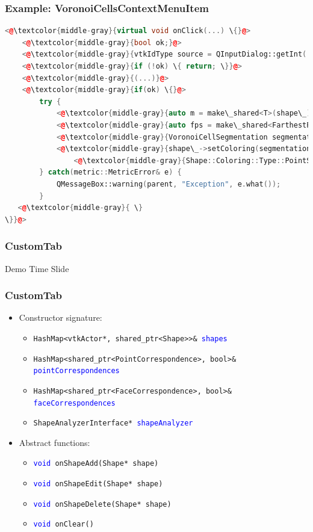 \documentclass[compress]{beamer}
\begin{document}
\begin{frame}[fragile]
  \frametitle{Example: VoronoiCellsContextMenuItem}

\begin{lstlisting}[language=C++, numbers=none]
<@\textcolor{middle-gray}{virtual void onClick(...) \{}@>
    <@\textcolor{middle-gray}{bool ok;}@>
    <@\textcolor{middle-gray}{vtkIdType source = QInputDialog::getInt(...);}@>
    <@\textcolor{middle-gray}{if (!ok) \{ return; \}}@>
    <@\textcolor{middle-gray}{(...)}@>
    <@\textcolor{middle-gray}{if(ok) \{}@>
        try {
            <@\textcolor{middle-gray}{auto m = make\_shared<T>(shape\_);}@>
            <@\textcolor{middle-gray}{auto fps = make\_shared<FarthestPointSampling>(shape\_, m, source, numberOfSegments);}@>
            <@\textcolor{middle-gray}{VoronoiCellSegmentation segmentation(shape\_, m, fps);}@>
            <@\textcolor{middle-gray}{shape\_->setColoring(segmentation.getSegments(), }@>
            	<@\textcolor{middle-gray}{Shape::Coloring::Type::PointSegmentation);}@>
        } catch(metric::MetricError& e) {
            QMessageBox::warning(parent, "Exception", e.what());
        }
   <@\textcolor{middle-gray}{ \}
\}}@>
\end{lstlisting}

\end{frame}

\begin{frame}
	\frametitle{CustomTab}
	
	Demo Time Slide
	
\end{frame}

\begin{frame}
	\frametitle{CustomTab}
	
	\begin{itemize}
		\item Constructor signature:
		\begin{itemize}
			\item \texttt{HashMap<vtkActor*, shared\_ptr<Shape>>\& \textcolor{blue}{shapes}}
			\item \texttt{HashMap<shared\_ptr<PointCorrespondence>, bool>\& \textcolor{blue}{pointCorrespondences}}
			\item \texttt{HashMap<shared\_ptr<FaceCorrespondence>, bool>\& \textcolor{blue}{faceCorrespondences}}
			\item \texttt{ShapeAnalyzerInterface* \textcolor{blue}{shapeAnalyzer}}
		\end{itemize}
		\item Abstract functions:
		\begin{itemize}
			\item \texttt{\textcolor{blue}{void} onShapeAdd(Shape* shape)}
			\item \texttt{\textcolor{blue}{void} onShapeEdit(Shape* shape)}
			\item \texttt{\textcolor{blue}{void} onShapeDelete(Shape* shape)}
			\item \texttt{\textcolor{blue}{void} onClear()}
		\end{itemize}
	\end{itemize}
\end{frame}
\end{document}
